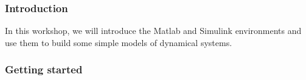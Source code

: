 \documentclass[9pt]{beamer-control}
\begin{document}

\begin{frame}
\frametitle{Introduction}
In this workshop, we will introduce the Matlab and Simulink environments and use them to build some simple models of dynamical systems.
\end{frame}


\begin{frame}[fragile]
\frametitle{Getting started}


\end{frame}
\end{document}
